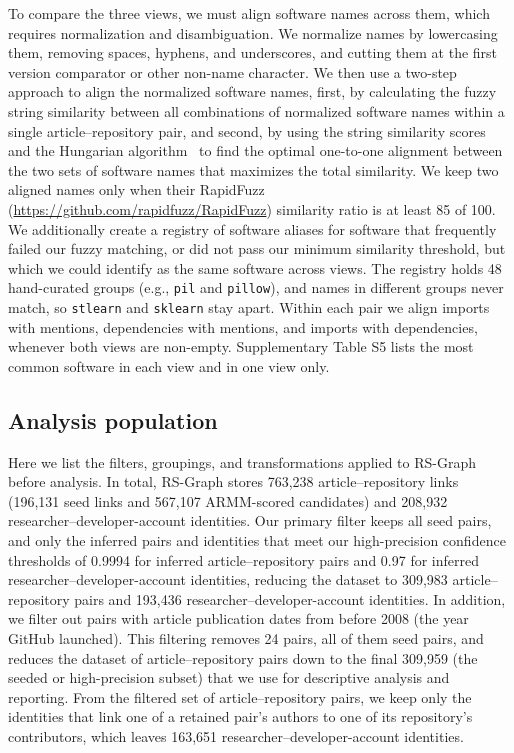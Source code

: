 \documentclass[pdflatex,sn-nature]{sn-jnl}%
\begin{document}
To compare the three views, we must align software names across them, which requires normalization and disambiguation.
We normalize names by lowercasing them, removing spaces, hyphens, and underscores, and cutting them at the first version comparator or other non-name character.
We then use a two-step approach to align the normalized software names, first, by calculating the fuzzy string similarity between all combinations of normalized software names within a single article--repository pair, and second, by using the string similarity scores and the Hungarian algorithm~\cite{crouse2016implementing} to find the optimal one-to-one alignment between the two sets of software names that maximizes the total similarity.
We keep two aligned names only when their RapidFuzz (\url{https://github.com/rapidfuzz/RapidFuzz}) similarity ratio is at least 85 of 100.
We additionally create a registry of software aliases for software that frequently failed our fuzzy matching, or did not pass our minimum similarity threshold, but which we could identify as the same software across views.
The registry holds 48 hand-curated groups (e.g., \texttt{pil} and \texttt{pillow}), and names in different groups never match, so \texttt{stlearn} and \texttt{sklearn} stay apart.
Within each pair we align imports with mentions, dependencies with mentions, and imports with dependencies, whenever both views are non-empty.
Supplementary Table S5 lists the most common software in each view and in one view only.

\subsection{Analysis population}\label{subsec:m-population}

Here we list the filters, groupings, and transformations applied to RS-Graph before analysis.
In total, RS-Graph stores 763,238 article--repository links (196,131 seed links and 567,107 ARMM-scored candidates) and 208,932 researcher--developer-account identities.
Our primary filter keeps all seed pairs, and only the inferred pairs and identities that meet our high-precision confidence thresholds of 0.9994 for inferred article--repository pairs and 0.97 for inferred researcher--developer-account identities, reducing the dataset to 309,983 article--repository pairs and 193,436 researcher--developer-account identities.
In addition, we filter out pairs with article publication dates from before 2008 (the year GitHub launched).
This filtering removes 24 pairs, all of them seed pairs, and reduces the dataset of article--repository pairs down to the final 309,959 (the seeded or high-precision subset) that we use for descriptive analysis and reporting.
From the filtered set of article--repository pairs, we keep only the identities that link one of a retained pair's authors to one of its repository's contributors, which leaves 163,651 researcher--developer-account identities.
\end{document}
